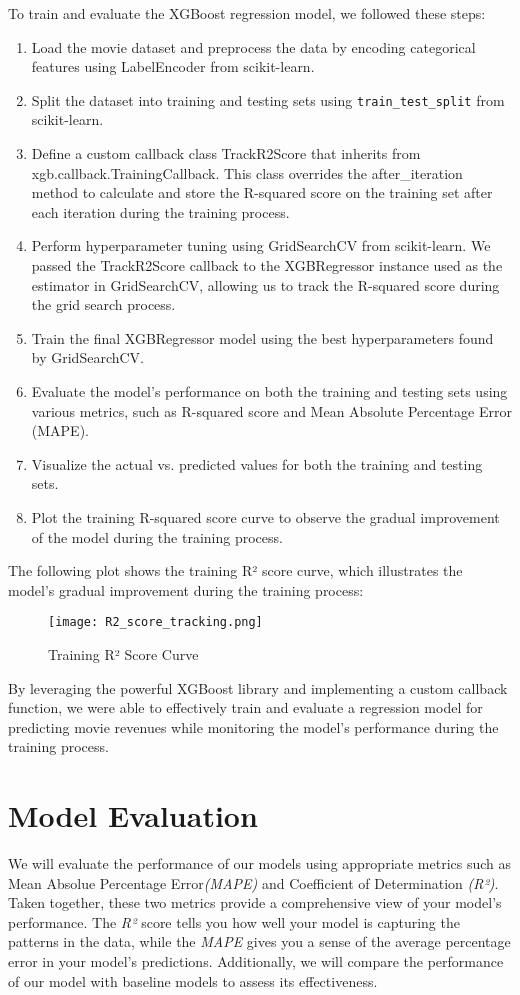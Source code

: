 \documentclass[conference]{IEEEtran}
\begin{document}
        To train and evaluate the XGBoost regression model, we followed these steps:
        \begin{enumerate}
        \item Load the movie dataset and preprocess the data by encoding categorical features using LabelEncoder from scikit-learn.
        \item Split the dataset into training and testing sets using \texttt{train\_test\_split} from scikit-learn.
        \item Define a custom callback class TrackR2Score that inherits from xgb.callback.TrainingCallback. This class overrides the after\_iteration method to calculate and store the R-squared score on the training set after each iteration during the training process.
        \item Perform hyperparameter tuning using GridSearchCV from scikit-learn. We passed the TrackR2Score callback to the XGBRegressor instance used as the estimator in GridSearchCV, allowing us to track the R-squared score during the grid search process.
        \item Train the final XGBRegressor model using the best hyperparameters found by GridSearchCV.
        \item Evaluate the model's performance on both the training and testing sets using various metrics, such as R-squared score and Mean Absolute Percentage Error (MAPE).
        \item Visualize the actual vs. predicted values for both the training and testing sets.
        \item Plot the training R-squared score curve to observe the gradual improvement of the model during the training process.
        \end{enumerate}
    The following plot shows the training R² score curve, which illustrates the model's gradual improvement during the training process:
    \begin{figure}[h]
        \centering
        \texttt{[image: R2\_score\_tracking.png]}
        \caption{Training R² Score Curve}
        \label{fig:xg_boost_track}
    \end{figure}
    By leveraging the powerful XGBoost library and implementing a custom callback function, we were able to effectively train and evaluate a regression model for predicting movie revenues while monitoring the model's performance during the training process.


\section{Model Evaluation}
    We will evaluate the performance of our models using appropriate metrics such as Mean Absolue Percentage Error\textit{(MAPE)} and Coefficient of Determination \textit{(R²)}. Taken together, these two metrics provide a comprehensive view of your model’s performance. The \textit{R²} score tells you how well your model is capturing the patterns in the data, while the \textit{MAPE} gives you a sense of the average percentage error in your model’s predictions. Additionally, we will compare the performance of our model with baseline models to assess its effectiveness.
\end{document}
